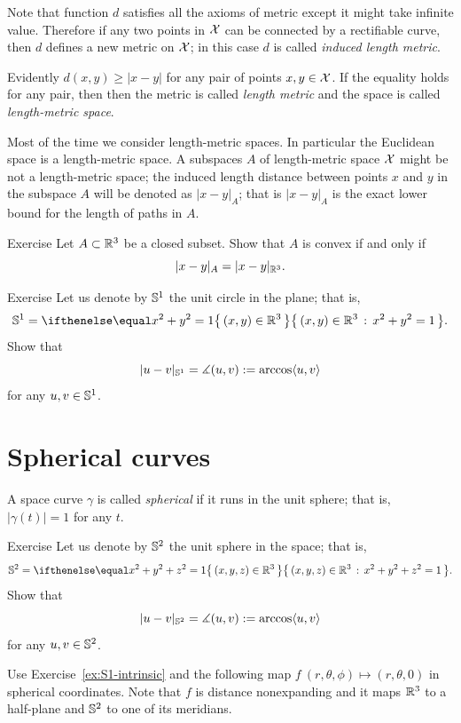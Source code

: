 Note that function $d$ satisfies all the axioms of metric except it might take infinite value.
Therefore if any two points in $\mathcal{X}$ can be connected by a rectifiable curve, then $d$ defines a new metric on $\mathcal{X}$; in this case $d$ is called \emph{induced length metric}.

Evidently $d(x,y)\ge |x-y|$ for any pair of points $x,y\in \mathcal{X}$.
If the equality holds for any pair, then then the metric is called \emph{length metric} and the space is called \emph{length-metric space}.

Most of the time we consider length-metric spaces.
In particular the Euclidean space is a length-metric space.
A subspaces $A$ of length-metric space $\mathcal{X}$ might be not a length-metric space;
the induced length distance between points $x$ and $y$ in the subspace $A$ will be denoted as $|x-y|_A$;
that is $|x-y|_A$ is the exact lower bound for the length of paths in $A$.

\begin{thm}{Exercise}\label{ex:intrinsic-convex}
Let $A\subset \mathbb{R}^3$ be a closed subset.
Show that $A$ is convex if and only if
\[|x-y|_A=|x-y|_{\mathbb{R}^3}.\]
\end{thm}

\begin{thm}{Exercise}\label{ex:S1-intrinsic}
Let us denote by $\mathbb{S}^1$ the unit circle in the plane; that is,
\[\SS^1=\set{(x,y)\in\RR^3}{x^2+y^2=1}.\]
Show that
\[|u-v|_{\mathbb{S}^1}=\measuredangle(u,v):=\arccos\langle u,v\rangle\]
for any $u,v\in \mathbb{S}^1$.
\end{thm}

\section*{Spherical curves}

A space curve $\gamma$ is called \emph{spherical} if it runs in the unit sphere;
that is, $|\gamma(t)|=1$ for any $t$.

\begin{thm}{Exercise}\label{ex:S2-intrinsic}
Let us denote by $\mathbb{S}^2$ the unit sphere in the space; that is,
\[\SS^2=\set{(x,y,z)\in\RR^3}{x^2+y^2+z^2=1}.\]
Show that
\[|u-v|_{\mathbb{S}^2}=\measuredangle(u,v):=\arccos\langle u,v\rangle\]
for any $u,v\in \mathbb{S}^2$.
\end{thm} %

 Use Exercise~\ref{ex:S1-intrinsic} and the following map $f\:(r,\theta,\phi)\mapsto (r,\theta,0)$ in spherical coordinates. Note that $f$ is distance nonexpanding and it maps $\mathbb{R}^3$ to a half-plane and $\mathbb{S}^2$ to one of its meridians.

